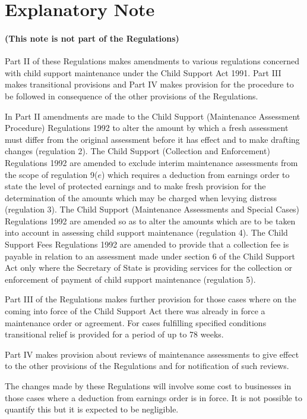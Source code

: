 \documentclass[a4paper]{article}
\newcommand{\parthead}{}
\begin{document}
\part{Explanatory Note}

\renewcommand\parthead{--- Explanatory Note}

\subsection*{(This note is not part of the Regulations)}

Part II of these Regulations makes amendments to various regulations concerned with child support maintenance under the Child Support Act 1991. Part III makes transitional provisions and Part IV makes provision for the procedure to be followed in consequence of the other provisions of the Regulations.

  In Part II amendments are made to the Child Support (Maintenance Assessment Procedure) Regulations 1992 to alter the amount by which a fresh assessment must differ from the original assessment before it has effect and to make drafting changes (regulation 2). The Child Support (Collection and Enforcement) Regulations 1992 are amended to exclude interim maintenance assessments from the scope of regulation 9($e$) which requires a deduction from earnings order to state the level of protected earnings and to make fresh provision for the determination of the amounts which may be charged when levying distress (regulation 3). The Child Support (Maintenance Assessments and Special Cases) Regulations 1992 are amended so as to alter the amounts which are to be taken into account in assessing child support maintenance (regulation 4). The Child Support Fees Regulations 1992 are amended to provide that a collection fee is payable in relation to an assessment made under section 6 of the Child Support Act only where the Secretary of State is providing services for the collection or enforcement of payment of child support maintenance (regulation 5).

  Part III of the Regulations makes further provision for those cases where on the coming into force of the Child Support Act there was already in force a maintenance order or agreement. For cases fulfilling specified conditions transitional relief is provided for a period of up to 78 weeks.

  Part IV makes provision about reviews of maintenance assessments to give effect to the other provisions of the Regulations and for notification of such reviews.

  The changes made by these Regulations will involve some cost to businesses in those cases where a deduction from earnings order is in force. It is not possible to quantify this but it is expected to be negligible.
\end{document}
